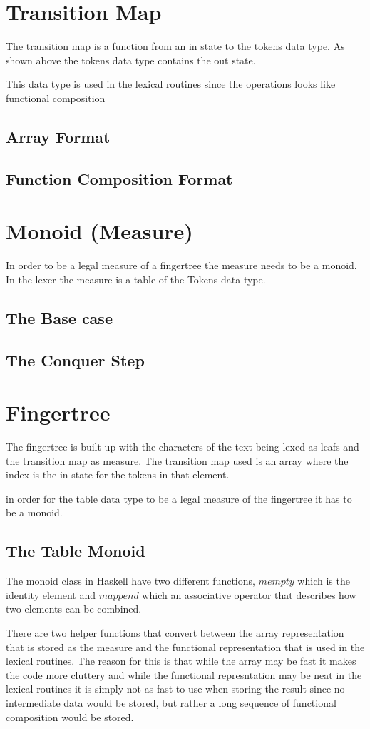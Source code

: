 \section{Transition Map}
The transition map is a function from an in state to the tokens data type. As
shown above the tokens data type contains the out state.

This data type is used in the lexical routines since the operations looks like
functional composition
\subsection{Array Format}
\subsection{Function Composition Format}

\section{Monoid (Measure)}
In order to be a legal measure of a fingertree the measure needs to be a monoid.
In the lexer the measure is a table of the Tokens data type.
\subsection{The Base case}
\subsection{The Conquer Step}

\section{Fingertree}
The fingertree is built up with the characters of the text being lexed as leafs
and the transition map as measure. The transition map used is an array where the
index is the in state for the tokens in that element.

in order for the table data type to be a legal measure of the fingertree it has
to be a monoid.
\subsection{The Table Monoid}
The monoid class in Haskell have two different functions, $mempty$ which is the
identity element and $mappend$ which an associative operator that describes how
two elements can be combined.

There are two helper functions that convert between the array representation
that is stored as the measure and the functional representation that is used in
the lexical routines. The reason for this is that while the array may be fast it
makes the code more cluttery and while the functional represntation may be neat
in the lexical routines it is simply not as fast to use when storing the result
since no intermediate data would be stored, but rather a long sequence of
functional composition would be stored.

